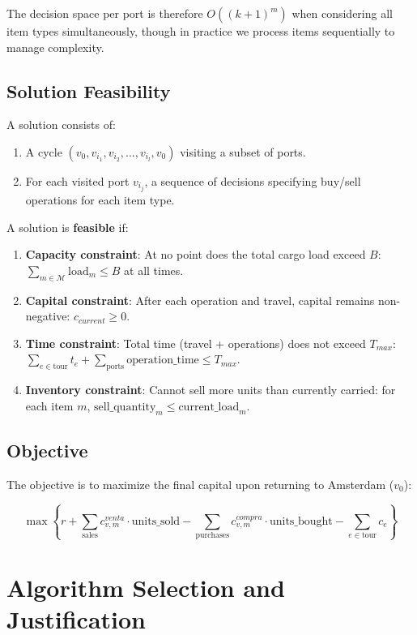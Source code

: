 \documentclass[12pt]{article}
\begin{document}
The decision space per port is therefore $O((k+1)^m)$ when considering all item types simultaneously, though in practice we process items sequentially to manage complexity.

\subsection{Solution Feasibility}

A solution consists of:
\begin{enumerate}
    \item A cycle $(v_0, v_{i_1}, v_{i_2}, ..., v_{i_l}, v_0)$ visiting a subset of ports.
    \item For each visited port $v_{i_j}$, a sequence of decisions specifying buy/sell operations for each item type.
\end{enumerate}

A solution is \textbf{feasible} if:
\begin{enumerate}
    \item \textbf{Capacity constraint}: At no point does the total cargo load exceed $B$: $\sum_{m \in \mathcal{M}} \text{load}_m \leq B$ at all times.
    \item \textbf{Capital constraint}: After each operation and travel, capital remains non-negative: $c_{current} \geq 0$.
    \item \textbf{Time constraint}: Total time (travel + operations) does not exceed $T_{max}$: $\sum_{e \in \text{tour}} t_e + \sum_{\text{ports}} \text{operation\_time} \leq T_{max}$.
    \item \textbf{Inventory constraint}: Cannot sell more units than currently carried: for each item $m$, $\text{sell\_quantity}_m \leq \text{current\_load}_m$.
\end{enumerate}

\subsection{Objective}

The objective is to maximize the final capital upon returning to Amsterdam ($v_0$):

$$\max \left\{ r + \sum_{\text{sales}} c_{v,m}^{venta} \cdot \text{units\_sold} - \sum_{\text{purchases}} c_{v,m}^{compra} \cdot \text{units\_bought} - \sum_{e \in \text{tour}} c_e \right\}$$

\section{Algorithm Selection and Justification}
\label{sec:algorithm_selection}
\end{document}
